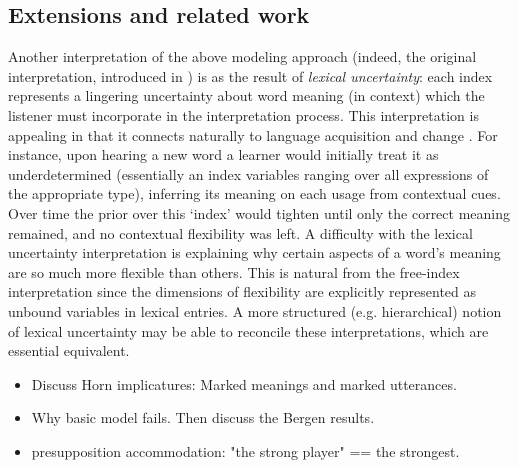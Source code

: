 \documentclass[pdfextras]{handbook}
\newcommand{\llbracket}{\ensuremath{\left [\!\left [}}%
\newcommand{\rrbracket}{\ensuremath{\right ]\!\right ]}}
\providecommand{\sv}[1]{\ensuremath{\llbracket \mathit{#1} \rrbracket}}
\begin{document}
\subsection{Extensions and related work}



Another interpretation of the above modeling approach (indeed, the original interpretation, introduced in \cite{bergen12}) is as the result of \emph{lexical uncertainty}: each index represents a lingering uncertainty about word meaning (in context) which the listener must incorporate in the interpretation process. 
This interpretation is appealing in that it connects naturally to language acquisition and change \cite{SmithFrankGoodman}. 
For instance, upon hearing a new word a learner would initially treat it as underdetermined (essentially an index variables ranging over all expressions of the appropriate type), inferring its meaning on each usage from contextual cues. 
Over time the prior over this `index' would tighten until only the correct meaning remained, and no contextual flexibility was left. 
A difficulty with the lexical uncertainty interpretation is explaining why certain aspects of a word's meaning are so much more flexible than others. 
This is natural from the free-index interpretation since the dimensions of flexibility are explicitly represented as unbound variables in lexical entries. 
A more structured (e.g. hierarchical) notion of lexical uncertainty may be able to reconcile these interpretations, which are essential equivalent.




\begin{itemize}
\item Discuss Horn implicatures:  Marked meanings and marked utterances.
\item Why basic model fails. Then discuss the Bergen results.

\item  presupposition accommodation: "the strong player" == the strongest.
\end{itemize}
\end{document}
